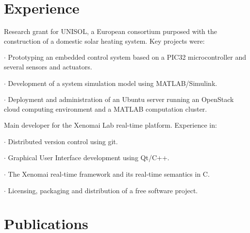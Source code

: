 \section*{Experience}

{
Research grant for UNISOL, a European consortium purposed with the construction
of a domestic solar heating system. Key projects were:

 $\cdot$  Prototyping an embedded control system based on a PIC32 microcontroller and
several sensors and actuators.

 $\cdot$  Development of a system simulation model using MATLAB/Simulink.

 $\cdot$  Deployment and administration of an Ubuntu server running an
OpenStack cloud computing environment and a MATLAB computation cluster.
}

\vspace{\baselineskip}
{
Main developer for the Xenomai Lab real-time platform. Experience in:

 $\cdot$ Distributed version control using git.

 $\cdot$ Graphical User Interface development using Qt/C++.

 $\cdot$ The Xenomai real-time framework and its real-time semantics in C.

 $\cdot$ Licensing, packaging and distribution of a free software project.

}

\section*{Publications}


